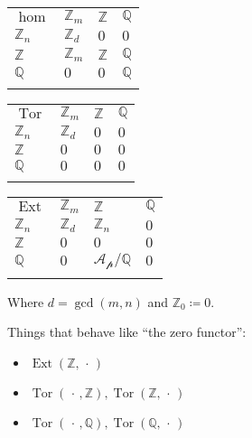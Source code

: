 \begin{longtable}[]{@{}llll@{}}
\toprule
\(\hom\) & \({\mathbb{Z}}_m\) & \({\mathbb{Z}}\) &
\({\mathbb{Q}}\) \\ \addlinespace
\midrule
\endhead
\({\mathbb{Z}}_n\) & \({\mathbb{Z}}_d\) & \(0\) & \(0\) \\ \addlinespace
\({\mathbb{Z}}\) & \({\mathbb{Z}}_m\) & \({\mathbb{Z}}\) &
\({\mathbb{Q}}\) \\ \addlinespace
\({\mathbb{Q}}\) & \(0\) & \(0\) & \({\mathbb{Q}}\) \\ \addlinespace
\bottomrule
\end{longtable}

\begin{longtable}[]{@{}llll@{}}
\toprule
\(\operatorname{Tor}\) & \({\mathbb{Z}}_m\) & \({\mathbb{Z}}\) &
\({\mathbb{Q}}\) \\ \addlinespace
\midrule
\endhead
\({\mathbb{Z}}_n\) & \({\mathbb{Z}}_d\) & \(0\) & \(0\) \\ \addlinespace
\({\mathbb{Z}}\) & \(0\) & \(0\) & \(0\) \\ \addlinespace
\({\mathbb{Q}}\) & \(0\) & \(0\) & \(0\) \\ \addlinespace
\bottomrule
\end{longtable}

\begin{longtable}[]{@{}llll@{}}
\toprule
\(\operatorname{Ext}\) & \({\mathbb{Z}}_m\) & \({\mathbb{Z}}\) &
\({\mathbb{Q}}\) \\ \addlinespace
\midrule
\endhead
\({\mathbb{Z}}_n\) & \({\mathbb{Z}}_d\) & \({\mathbb{Z}}_n\) &
\(0\) \\ \addlinespace
\({\mathbb{Z}}\) & \(0\) & \(0\) & \(0\) \\ \addlinespace
\({\mathbb{Q}}\) & \(0\) & \(\mathcal{A_p}/{\mathbb{Q}}\) &
\(0\) \\ \addlinespace
\bottomrule
\end{longtable}

Where \(d = \gcd(m, n)\) and \({\mathbb{Z}}_0 \coloneqq 0\).

Things that behave like ``the zero functor'':

\begin{itemize}
\tightlist
\item
  \(\operatorname{Ext} ({\mathbb{Z}}, {\,\cdot\,})\)
\item
  \(\operatorname{Tor}({\,\cdot\,}, {\mathbb{Z}}), \operatorname{Tor}({\mathbb{Z}}, {\,\cdot\,})\)
\item
  \(\operatorname{Tor}({\,\cdot\,}, {\mathbb{Q}}), \operatorname{Tor}({\mathbb{Q}}, {\,\cdot\,})\)
\end{itemize}

